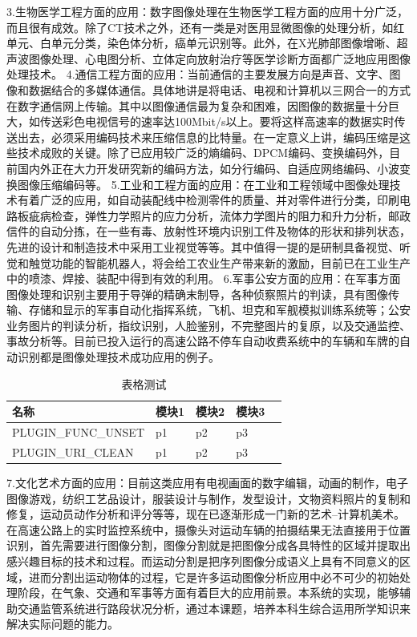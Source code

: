 \documentclass[18pt, twoside, a4paper, dvipdfm]{book}
\begin{document}
3.生物医学工程方面的应用：数字图像处理在生物医学工程方面的应用十分广泛，而且很有成效。除了CT技术之外，还有一类是对医用显微图像的处理分析，如红单元、白单元分类，染色体分析，癌单元识别等。此外，在X光肺部图像增晰、超声波图像处理、心电图分析、立体定向放射治疗等医学诊断方面都广泛地应用图像处理技术。 
4.通信工程方面的应用：当前通信的主要发展方向是声音、文字、图像和数据结合的多媒体通信。具体地讲是将电话、电视和计算机以三网合一的方式在数字通信网上传输。其中以图像通信最为复杂和困难，因图像的数据量十分巨大，如传送彩色电视信号的速率达100Mbit/s以上。要将这样高速率的数据实时传送出去，必须采用编码技术来压缩信息的比特量。在一定意义上讲，编码压缩是这些技术成败的关键。除了已应用较广泛的熵编码、DPCM编码、变换编码外，目前国内外正在大力开发研究新的编码方法，如分行编码、自适应网络编码、小波变换图像压缩编码等。
5.工业和工程方面的应用：在工业和工程领域中图像处理技术有着广泛的应用，如自动装配线中检测零件的质量、并对零件进行分类，印刷电路板疵病检查，弹性力学照片的应力分析，流体力学图片的阻力和升力分析，邮政信件的自动分拣，在一些有毒、放射性环境内识别工件及物体的形状和排列状态，先进的设计和制造技术中采用工业视觉等等。其中值得一提的是研制具备视觉、听觉和触觉功能的智能机器人，将会给工农业生产带来新的激励，目前已在工业生产中的喷漆、焊接、装配中得到有效的利用。 
6.军事公安方面的应用：在军事方面图像处理和识别主要用于导弹的精确末制导，各种侦察照片的判读，具有图像传输、存储和显示的军事自动化指挥系统，飞机、坦克和军舰模拟训练系统等；公安业务图片的判读分析，指纹识别，人脸鉴别，不完整图片的复原，以及交通监控、事故分析等。目前已投入运行的高速公路不停车自动收费系统中的车辆和车牌的自动识别都是图像处理技术成功应用的例子。 

\begin{table}[htbp]
\setlength{\abovecaptionskip}{0pt} 
\setlength{\belowcaptionskip}{10pt} 
\caption{表格测试}
\centering
\begin{tabularx}{\textwidth}{XXXXl} %
\toprule
\centering 名称 & \centering  模块1 & \centering  模块2 &\centering 模块3&\\
\midrule
\centering PLUGIN\_FUNC\_UNSET &\centering  p1 &\centering  p2 &\centering  p3&\\
\centering PLUGIN\_URI\_CLEAN &\centering  p1 &\centering  p2 &\centering  p3&\\
\bottomrule
\end{tabularx}
\end{table}

7.文化艺术方面的应用：目前这类应用有电视画面的数字编辑，动画的制作，电子图像游戏，纺织工艺品设计，服装设计与制作，发型设计，文物资料照片的复制和修复，运动员动作分析和评分等等，现在已逐渐形成一门新的艺术--计算机美术。
在高速公路上的实时监控系统中，摄像头对运动车辆的拍摄结果无法直接用于位置识别，首先需要进行图像分割，图像分割就是把图像分成各具特性的区域并提取出感兴趣目标的技术和过程。而运动分割是把序列图像分成语义上具有不同意义的区域，进而分割出运动物体的过程，它是许多运动图像分析应用中必不可少的初始处理阶段，在气象、交通和军事等方面有着巨大的应用前景。本系统的实现，能够辅助交通监管系统进行路段状况分析，通过本课题，培养本科生综合运用所学知识来解决实际问题的能力。
\end{document}
